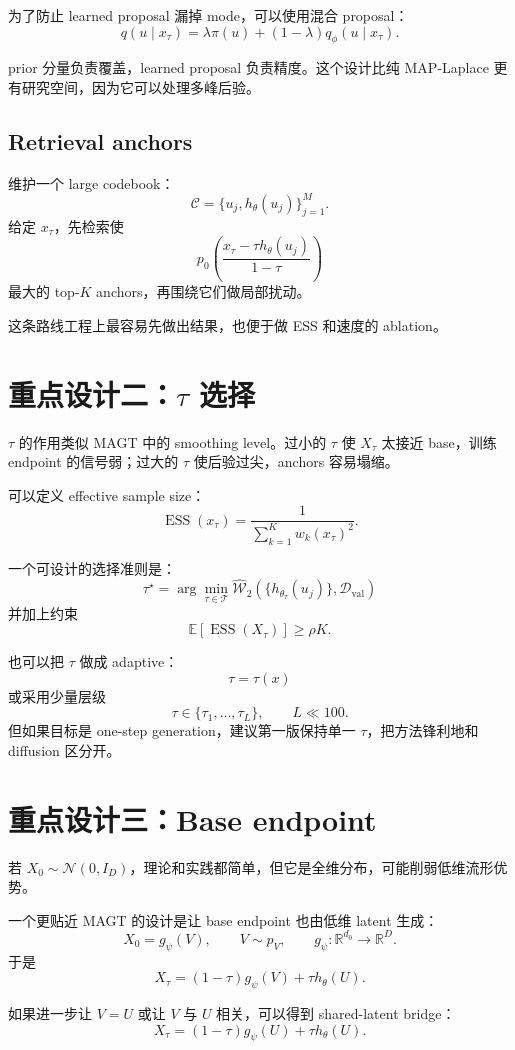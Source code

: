 \documentclass[UTF8,11pt]{ctexart}
\newcommand{\E}{\mathbb{E}}
\newcommand{\R}{\mathbb{R}}
\newcommand{\cN}{\mathcal{N}}
\newcommand{\ESS}{\operatorname{ESS}}
\newcommand{\W}{\mathcal{W}}
\begin{document}
为了防止 learned proposal 漏掉 mode，可以使用混合 proposal：
\[
q(u\mid x_\tau)
=
\lambda\pi(u)
+
(1-\lambda)q_\phi(u\mid x_\tau).
\]

prior 分量负责覆盖，learned proposal 负责精度。这个设计比纯 MAP-Laplace 更有研究空间，因为它可以处理多峰后验。

\subsection{Retrieval anchors}

维护一个 large codebook：
\[
\mathcal C=\{u_j,h_\theta(u_j)\}_{j=1}^M.
\]
给定 \(x_\tau\)，先检索使
\[
p_0\left(
\frac{x_\tau-\tau h_\theta(u_j)}{1-\tau}
\right)
\]
最大的 top-\(K\) anchors，再围绕它们做局部扰动。

这条路线工程上最容易先做出结果，也便于做 ESS 和速度的 ablation。

\section{重点设计二：\(\tau\) 选择}

\(\tau\) 的作用类似 MAGT 中的 smoothing level。过小的 \(\tau\) 使 \(X_\tau\) 太接近 base，训练 endpoint 的信号弱；过大的 \(\tau\) 使后验过尖，anchors 容易塌缩。

可以定义 effective sample size：
\[
\ESS(x_\tau)
=
\frac{1}{\sum_{k=1}^Kw_k(x_\tau)^2}.
\]

一个可设计的选择准则是：
\[
\tau^\star
=
\arg\min_{\tau\in\mathcal T}
\widehat{\W}_2
\left(
\{h_{\theta_\tau}(u_j)\},
\mathcal D_{\mathrm{val}}
\right)
\]
并加上约束
\[
\E[\ESS(X_\tau)]\ge \rho K.
\]

也可以把 \(\tau\) 做成 adaptive：
\[
\tau=\tau(x)
\]
或采用少量层级
\[
\tau\in\{\tau_1,\dots,\tau_L\},
\qquad L\ll 100.
\]
但如果目标是 one-step generation，建议第一版保持单一 \(\tau\)，把方法锋利地和 diffusion 区分开。

\section{重点设计三：Base endpoint}

若 \(X_0\sim\cN(0,I_D)\)，理论和实践都简单，但它是全维分布，可能削弱低维流形优势。

一个更贴近 MAGT 的设计是让 base endpoint 也由低维 latent 生成：
\[
X_0=g_\psi(V),
\qquad
V\sim p_V,
\qquad
g_\psi:\R^{d_0}\to\R^D.
\]
于是
\[
X_\tau=(1-\tau)g_\psi(V)+\tau h_\theta(U).
\]

如果进一步让 \(V=U\) 或让 \(V\) 与 \(U\) 相关，可以得到 shared-latent bridge：
\[
X_\tau=(1-\tau)g_\psi(U)+\tau h_\theta(U).
\]
\end{document}
